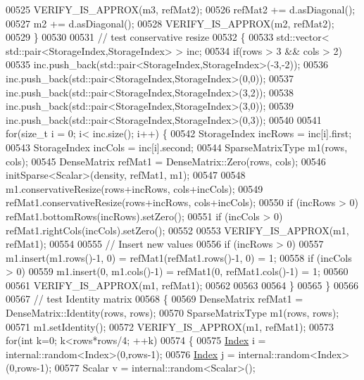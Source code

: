 \begin{DoxyCode}
00525     VERIFY\_IS\_APPROX(m3, refMat2);
00526     refMat2 += d.asDiagonal();
00527     m2 += d.asDiagonal();
00528     VERIFY\_IS\_APPROX(m2, refMat2);
00529   \}
00530   
00531   \textcolor{comment}{// test conservative resize}
00532   \{
00533       std::vector< std::pair<StorageIndex,StorageIndex> > inc;
00534       \textcolor{keywordflow}{if}(rows > 3 && cols > 2)
00535         inc.push\_back(std::pair<StorageIndex,StorageIndex>(-3,-2));
00536       inc.push\_back(std::pair<StorageIndex,StorageIndex>(0,0));
00537       inc.push\_back(std::pair<StorageIndex,StorageIndex>(3,2));
00538       inc.push\_back(std::pair<StorageIndex,StorageIndex>(3,0));
00539       inc.push\_back(std::pair<StorageIndex,StorageIndex>(0,3));
00540       
00541       \textcolor{keywordflow}{for}(\textcolor{keywordtype}{size\_t} i = 0; i< inc.size(); i++) \{
00542         StorageIndex incRows = inc[i].first;
00543         StorageIndex incCols = inc[i].second;
00544         SparseMatrixType m1(rows, cols);
00545         DenseMatrix refMat1 = DenseMatrix::Zero(rows, cols);
00546         initSparse<Scalar>(density, refMat1, m1);
00547         
00548         m1.conservativeResize(rows+incRows, cols+incCols);
00549         refMat1.conservativeResize(rows+incRows, cols+incCols);
00550         \textcolor{keywordflow}{if} (incRows > 0) refMat1.bottomRows(incRows).setZero();
00551         \textcolor{keywordflow}{if} (incCols > 0) refMat1.rightCols(incCols).setZero();
00552         
00553         VERIFY\_IS\_APPROX(m1, refMat1);
00554         
00555         \textcolor{comment}{// Insert new values}
00556         \textcolor{keywordflow}{if} (incRows > 0) 
00557           m1.insert(m1.rows()-1, 0) = refMat1(refMat1.rows()-1, 0) = 1;
00558         \textcolor{keywordflow}{if} (incCols > 0) 
00559           m1.insert(0, m1.cols()-1) = refMat1(0, refMat1.cols()-1) = 1;
00560           
00561         VERIFY\_IS\_APPROX(m1, refMat1);
00562           
00563           
00564       \}
00565   \}
00566 
00567   \textcolor{comment}{// test Identity matrix}
00568   \{
00569     DenseMatrix refMat1 = DenseMatrix::Identity(rows, rows);
00570     SparseMatrixType m1(rows, rows);
00571     m1.setIdentity();
00572     VERIFY\_IS\_APPROX(m1, refMat1);
00573     \textcolor{keywordflow}{for}(\textcolor{keywordtype}{int} k=0; k<rows*rows/4; ++k)
00574     \{
00575       \hyperlink{namespace_eigen_a62e77e0933482dafde8fe197d9a2cfde}{Index} i = internal::random<Index>(0,rows-1);
00576       \hyperlink{namespace_eigen_a62e77e0933482dafde8fe197d9a2cfde}{Index} j = internal::random<Index>(0,rows-1);
00577       Scalar v = internal::random<Scalar>();

\end{DoxyCode}
